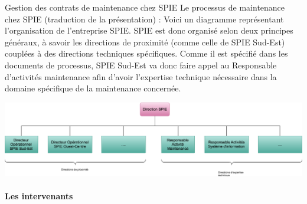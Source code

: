 
Gestion des contrats de maintenance chez SPIE
Le processus de maintenance chez SPIE (traduction de la présentation) :
Voici un diagramme représentant l'organisation de l'entreprise SPIE. SPIE est donc organisé selon deux principes généraux, à savoir les directions de proximité (comme celle de SPIE Sud-Est) couplées à des directions techniques spécifiques. Comme il est spécifié dans les documents de processus, SPIE Sud-Est va donc faire appel au Responsable d'activités maintenance afin d'avoir l'expertise technique nécessaire dans la domaine spécifique de la maintenance concernée.

\begin {center}
\includegraphics[width=\textwidth]{png/DiagrammeOrganisationnelSPIE.png}
\end {center}

\paragraph{Les intervenants}

